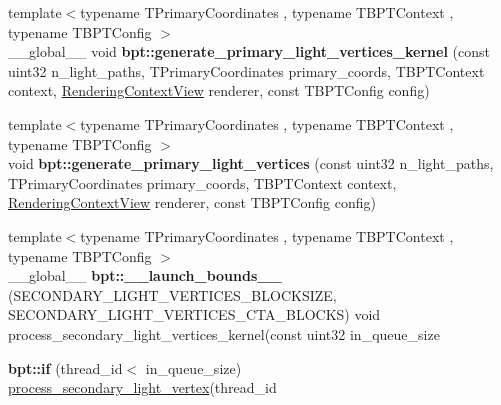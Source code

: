 \begin{DoxyCompactItemize}
\item 
\mbox{\label{group___b_p_t_lib_ga5983a4562bb68a326810f2e12a7109d2}} 
{\footnotesize template$<$typename T\+Primary\+Coordinates , typename T\+B\+P\+T\+Context , typename T\+B\+P\+T\+Config $>$ }\\\+\_\+\+\_\+global\+\_\+\+\_\+ void {\bfseries bpt\+::generate\+\_\+primary\+\_\+light\+\_\+vertices\+\_\+kernel} (const uint32 n\+\_\+light\+\_\+paths, T\+Primary\+Coordinates primary\+\_\+coords, T\+B\+P\+T\+Context context, \hyperlink{struct_rendering_context_view}{Rendering\+Context\+View} renderer, const T\+B\+P\+T\+Config config)
\item 
\mbox{\label{group___b_p_t_lib_ga9bda9ac181c56dbf094b140e54e8e680}} 
{\footnotesize template$<$typename T\+Primary\+Coordinates , typename T\+B\+P\+T\+Context , typename T\+B\+P\+T\+Config $>$ }\\void {\bfseries bpt\+::generate\+\_\+primary\+\_\+light\+\_\+vertices} (const uint32 n\+\_\+light\+\_\+paths, T\+Primary\+Coordinates primary\+\_\+coords, T\+B\+P\+T\+Context context, \hyperlink{struct_rendering_context_view}{Rendering\+Context\+View} renderer, const T\+B\+P\+T\+Config config)
\item 
\mbox{\label{group___b_p_t_lib_gaa74f11861e08bbf114797dacfa20e528}} 
{\footnotesize template$<$typename T\+Primary\+Coordinates , typename T\+B\+P\+T\+Context , typename T\+B\+P\+T\+Config $>$ }\\\+\_\+\+\_\+global\+\_\+\+\_\+ {\bfseries bpt\+::\+\_\+\+\_\+launch\+\_\+bounds\+\_\+\+\_\+} (S\+E\+C\+O\+N\+D\+A\+R\+Y\+\_\+\+L\+I\+G\+H\+T\+\_\+\+V\+E\+R\+T\+I\+C\+E\+S\+\_\+\+B\+L\+O\+C\+K\+S\+I\+ZE, S\+E\+C\+O\+N\+D\+A\+R\+Y\+\_\+\+L\+I\+G\+H\+T\+\_\+\+V\+E\+R\+T\+I\+C\+E\+S\+\_\+\+C\+T\+A\+\_\+\+B\+L\+O\+C\+KS) void process\+\_\+secondary\+\_\+light\+\_\+vertices\+\_\+kernel(const uint32 in\+\_\+queue\+\_\+size
\item 
\mbox{\label{group___b_p_t_lib_ga2bbfb4a4dfd24ddc1af3e6b4998f6755}} 
{\bfseries bpt\+::if} (thread\+\_\+id$<$ in\+\_\+queue\+\_\+size) \hyperlink{group___b_p_t_lib_core_ga124952cd2917df181f6aa6f39cdeda1b}{process\+\_\+secondary\+\_\+light\+\_\+vertex}(thread\+\_\+id
\item 
\mbox{\label{group___b_p_t_lib_ga09acd5912961fb37e1d418f0b019dec4}} 

\end{DoxyCompactItemize}
